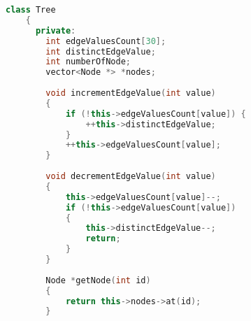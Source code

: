 \begin{lstlisting}[language=C++, firstnumber=0]
	class Tree
	{
	  private:
		int edgeValuesCount[30];
		int distinctEdgeValue;
		int numberOfNode;
		vector<Node *> *nodes;
	
		void incrementEdgeValue(int value)
		{
			if (!this->edgeValuesCount[value]) {
				++this->distinctEdgeValue;
			}
			++this->edgeValuesCount[value];
		}
	
		void decrementEdgeValue(int value)
		{
			this->edgeValuesCount[value]--;
			if (!this->edgeValuesCount[value])
			{
				this->distinctEdgeValue--;
				return;
			}
		}
	
		Node *getNode(int id)
		{
			return this->nodes->at(id);
		}
	
	\end{lstlisting}
	
